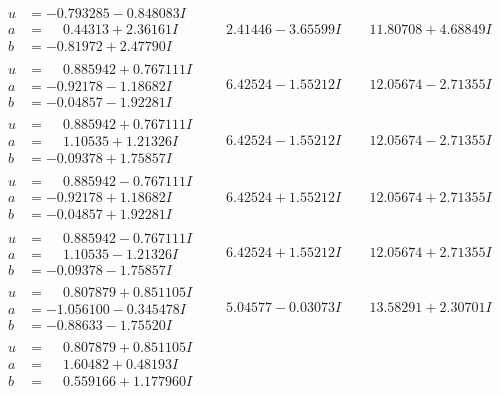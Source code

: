 \documentclass[1p]{elsarticle_modified}
\theoremstyle{definition}
\begin{document}
$$\begin{array}{c|c|c}
\begin{aligned}
u &= -0.793285 - 0.848083 I \\
a &= \phantom{-}0.44313 + 2.36161 I \\
b &= -0.81972 + 2.47790 I\end{aligned}
 & \phantom{-}2.41446 - 3.65599 I & \phantom{-}11.80708 + 4.68849 I \\ \hline\begin{aligned}
u &= \phantom{-}0.885942 + 0.767111 I \\
a &= -0.92178 - 1.18682 I \\
b &= -0.04857 - 1.92281 I\end{aligned}
 & \phantom{-}6.42524 - 1.55212 I & \phantom{-}12.05674 - 2.71355 I \\ \hline\begin{aligned}
u &= \phantom{-}0.885942 + 0.767111 I \\
a &= \phantom{-}1.10535 + 1.21326 I \\
b &= -0.09378 + 1.75857 I\end{aligned}
 & \phantom{-}6.42524 - 1.55212 I & \phantom{-}12.05674 - 2.71355 I \\ \hline\begin{aligned}
u &= \phantom{-}0.885942 - 0.767111 I \\
a &= -0.92178 + 1.18682 I \\
b &= -0.04857 + 1.92281 I\end{aligned}
 & \phantom{-}6.42524 + 1.55212 I & \phantom{-}12.05674 + 2.71355 I \\ \hline\begin{aligned}
u &= \phantom{-}0.885942 - 0.767111 I \\
a &= \phantom{-}1.10535 - 1.21326 I \\
b &= -0.09378 - 1.75857 I\end{aligned}
 & \phantom{-}6.42524 + 1.55212 I & \phantom{-}12.05674 + 2.71355 I \\ \hline\begin{aligned}
u &= \phantom{-}0.807879 + 0.851105 I \\
a &= -1.056100 - 0.345478 I \\
b &= -0.88633 - 1.75520 I\end{aligned}
 & \phantom{-}5.04577 - 0.03073 I & \phantom{-}13.58291 + 2.30701 I \\ \hline\begin{aligned}
u &= \phantom{-}0.807879 + 0.851105 I \\
a &= \phantom{-}1.60482 + 0.48193 I \\
b &= \phantom{-}0.559166 + 1.177960 I\end{aligned}

\end{array}$$
\end{document}
